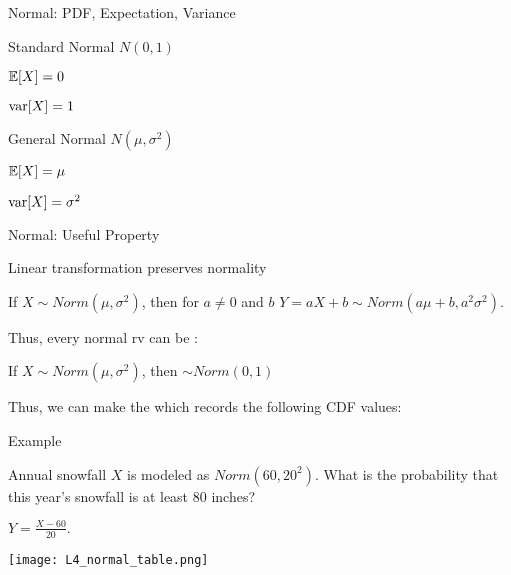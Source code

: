 \documentclass[fleqn,aspectratio=169]{beamer}
\begin{document}
\begin{frame}{Normal: PDF, Expectation, Variance}

{
\plitemsep 0.1in
\bci 
\item<1-> Standard Normal $N(0,1)$
\item<1-> $\mathbb{E}[ X ] = 0$

\item<1-> $\text{var}[ X ] = 1$
\eci
}
{
\plitemsep 0.1in
\bci 
\item<2-> General Normal $N(\mu, \sigma^2)$

\item<2-> $\mathbb{E}[ X ] = \mu$

\item<2-> $\text{var}[ X ] = \sigma^2$

\eci
}

\medskip

\end{frame}

\begin{frame}{Normal: Useful Property}

\plitemsep 0.1in
\bci 
\item<2-> Linear transformation preserves normality

{
If $X \sim  Norm(\mu, \sigma^2) $, then for $a \neq 0$ and $b$ $Y = aX +b \sim Norm(a\mu +b,a^2 \sigma^2).$ 
}

\item<3-> Thus, every normal rv can be : 

If $X \sim  Norm(\mu, \sigma^2)$, then 
 $\sim Norm(0,1)$

\item<5-> Thus, we can make the  which records the following CDF values:

\eci
\end{frame}

\begin{frame}{Example}

\medskip

{
\plitemsep 0.1in
\bci 
\item<1-> Annual snowfall $X$ is modeled as $Norm(60,20^2).$ What is the probability that this year's snowfall is at least 80 inches?

\item<2-> $Y = \frac{X-60}{20}.$
\eci
}
{
\texttt{[image: L4\_normal\_table.png]}
}
\end{frame}
\end{document}
